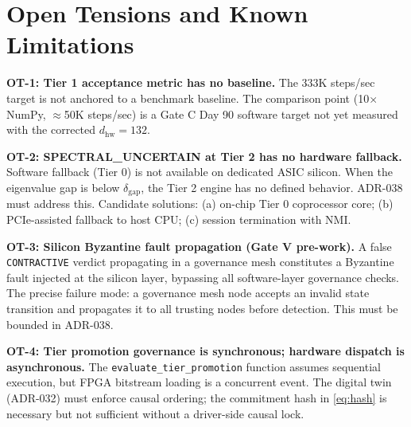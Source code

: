 \documentclass[12pt,letterpaper]{article}
\theoremstyle{plain}
\theoremstyle{definition}
\theoremstyle{remark}
\begin{document}
\section{Open Tensions and Known Limitations}

\begin{warningbox}
\textbf{OT-1: Tier 1 acceptance metric has no baseline.} The 333K steps/sec
target is not anchored to a benchmark baseline. The comparison point
(10$\times$ NumPy, $\approx$50K steps/sec) is a Gate C Day 90 software target
not yet measured with the corrected \(d_{\mathrm{hw}} = 132\).
\end{warningbox}

\begin{warningbox}
\textbf{OT-2: SPECTRAL\_UNCERTAIN at Tier 2 has no hardware fallback.} Software
fallback (Tier 0) is not available on dedicated ASIC silicon. When the eigenvalue
gap is below \(\delta_{\mathrm{gap}}\), the Tier 2 engine has no defined behavior.
ADR-038 must address this. Candidate solutions: (a) on-chip Tier 0 coprocessor
core; (b) PCIe-assisted fallback to host CPU; (c) session termination with NMI.
\end{warningbox}

\begin{warningbox}
\textbf{OT-3: Silicon Byzantine fault propagation (Gate V pre-work).} A false
\texttt{CONTRACTIVE} verdict propagating in a governance mesh constitutes a
Byzantine fault injected at the silicon layer, bypassing all software-layer
governance checks. The precise failure mode: a governance mesh node accepts
an invalid state transition and propagates it to all trusting nodes before
detection. This must be bounded in ADR-038.
\end{warningbox}

\begin{warningbox}
\textbf{OT-4: Tier promotion governance is synchronous; hardware dispatch is
asynchronous.} The \texttt{evaluate\_tier\_promotion} function assumes sequential
execution, but FPGA bitstream loading is a concurrent event. The digital twin
(ADR-032) must enforce causal ordering; the commitment hash in \cref{eq:hash}
is necessary but not sufficient without a driver-side causal lock.
\end{warningbox}

\end{document}
